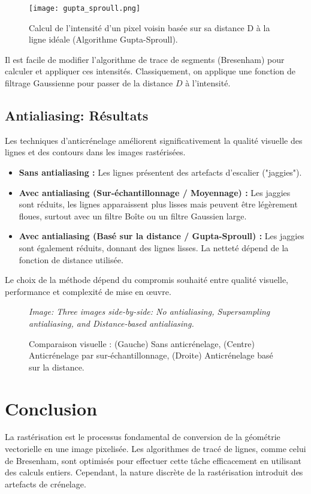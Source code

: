 \documentclass{article}
\begin{document}
\begin{figure}[H]
\centering
\texttt{[image: gupta\_sproull.png]}
\caption{Calcul de l'intensité d'un pixel voisin basée sur sa distance D à la ligne idéale (Algorithme Gupta-Sproull).}
\label{fig:gupta_sproull}
\end{figure}

Il est facile de modifier l'algorithme de trace de segments (Bresenham) pour calculer et appliquer ces intensités. Classiquement, on applique une fonction de filtrage Gaussienne pour passer de la distance $D$ à l'intensité.

\subsection{Antialiasing: Résultats}
Les techniques d'anticrénelage améliorent significativement la qualité visuelle des lignes et des contours dans les images rastérisées.
\begin{itemize}
    \item \textbf{Sans antialiasing :} Les lignes présentent des artefacts d'escalier ("jaggies").
    \item \textbf{Avec antialiasing (Sur-échantillonnage / Moyennage) :} Les jaggies sont réduits, les lignes apparaissent plus lisses mais peuvent être légèrement floues, surtout avec un filtre Boîte ou un filtre Gaussien large.
    \item \textbf{Avec antialiasing (Basé sur la distance / Gupta-Sproull) :} Les jaggies sont également réduits, donnant des lignes lisses. La netteté dépend de la fonction de distance utilisée.
\end{itemize}
Le choix de la méthode dépend du compromis souhaité entre qualité visuelle, performance et complexité de mise en œuvre.

\begin{figure}[H]
\centering
\textit{Image: Three images side-by-side: No antialiasing, Supersampling antialiasing, and Distance-based antialiasing.}
\caption{Comparaison visuelle : (Gauche) Sans anticrénelage, (Centre) Anticrénelage par sur-échantillonnage, (Droite) Anticrénelage basé sur la distance.}
\label{fig:antialiasing_results}
\end{figure}

\section{Conclusion}
La rastérisation est le processus fondamental de conversion de la géométrie vectorielle en une image pixelisée. Les algorithmes de tracé de lignes, comme celui de Bresenham, sont optimisés pour effectuer cette tâche efficacement en utilisant des calculs entiers. Cependant, la nature discrète de la rastérisation introduit des artefacts de crénelage.
\end{document}
